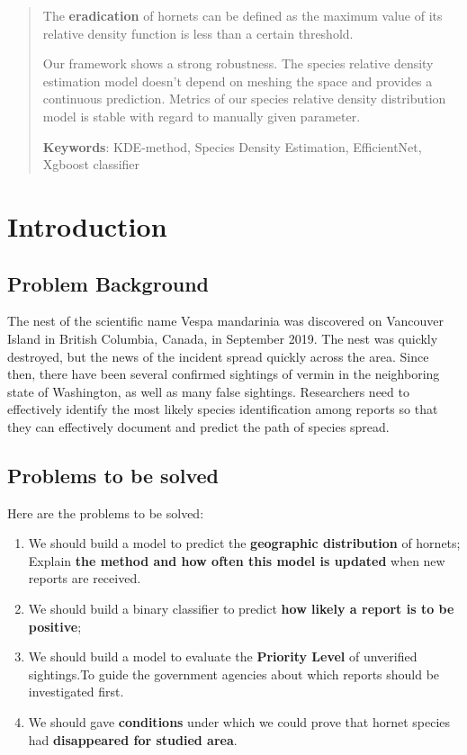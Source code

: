 \documentclass[12pt]{article}
\begin{document}
\begin{abstract}
The \textbf{eradication} of hornets can be defined as the maximum value of its relative density function is less than a certain threshold.

Our framework shows a strong robustness. The species relative density estimation model doesn't depend on meshing the space and provides a continuous prediction. Metrics of our species relative density distribution model is stable with regard to manually given parameter.

\textbf{Keywords}: KDE-method, Species Density Estimation, EfficientNet, Xgboost classifier

\end{abstract}

\clearpage
\pagestyle{fancy}
\tableofcontents 
\newpage



\section{Introduction}
\subsection{Problem Background}
The nest of the scientific name Vespa mandarinia was discovered on Vancouver Island in British Columbia, Canada, in September 2019. The nest was quickly destroyed, but the news of the incident spread quickly across the area. Since then, there have been several confirmed sightings of vermin in the neighboring state of Washington, as well as many false sightings. Researchers need to effectively identify the most likely species identification among reports so that they can effectively document and predict the path of species spread.

\subsection{Problems to be solved}
Here are the problems to be solved:
\begin{enumerate}[\quad\bf1.]
	\item We should build a model to predict the \textbf{geographic distribution} of hornets; Explain \textbf{the method and how often this model is updated} when new reports are received.
	\item We should build a binary classifier to predict \textbf{how likely a report is to be positive};
	\item We should build a model to evaluate the \textbf{Priority Level} of unverified sightings.To guide the government agencies about which reports should be investigated first.
	\item We should gave \textbf{conditions} under which we could prove that hornet species had \textbf{disappeared for studied area}.
\end{enumerate}
\end{document}
